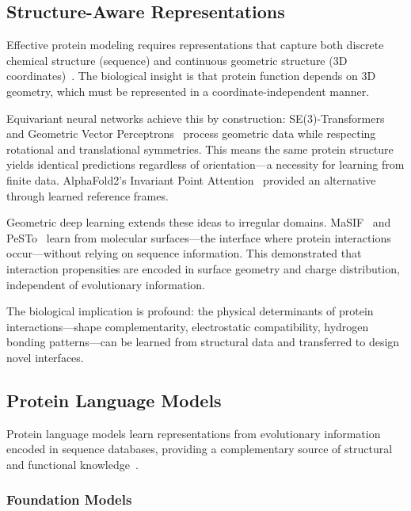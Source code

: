 \subsection{Structure-Aware Representations}
\label{subsec:structure}

Effective protein modeling requires representations that capture both discrete chemical structure (sequence) and continuous geometric structure (3D coordinates)~\cite{fuchs2020se3transformer,jing2021gvp}. The biological insight is that protein function depends on 3D geometry, which must be represented in a coordinate-independent manner.

Equivariant neural networks achieve this by construction: SE(3)-Transformers~\cite{fuchs2020se3transformer} and Geometric Vector Perceptrons~\cite{jing2021gvp} process geometric data while respecting rotational and translational symmetries. This means the same protein structure yields identical predictions regardless of orientation---a necessity for learning from finite data. AlphaFold2's Invariant Point Attention~\cite{jumper2021alphafold} provided an alternative through learned reference frames.

Geometric deep learning extends these ideas to irregular domains. MaSIF~\cite{gainza2020masif} and PeSTo~\cite{gao2023pestoppi} learn from molecular surfaces---the interface where protein interactions occur---without relying on sequence information. This demonstrated that interaction propensities are encoded in surface geometry and charge distribution, independent of evolutionary information.

The biological implication is profound: the physical determinants of protein interactions---shape complementarity, electrostatic compatibility, hydrogen bonding patterns---can be learned from structural data and transferred to design novel interfaces.

\subsection{Protein Language Models}
\label{subsec:plm}

Protein language models learn representations from evolutionary information encoded in sequence databases, providing a complementary source of structural and functional knowledge~\cite{rives2021esm1b,lin2023esm2}.

\subsubsection{Foundation Models}


